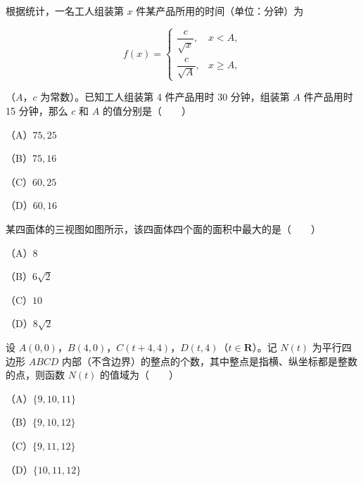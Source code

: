 \begin{question}
根据统计，一名工人组装第 $x$ 件某产品所用的时间（单位：分钟）为

\nopagebreak[4]
\[
f(x)=\begin{cases}\dfrac{c}{\sqrt{x}},&x<A,\\[3mm]\dfrac{c}{\sqrt{A}},&x\geqslant A,\end{cases}
\]

（$A$，$c$ 为常数）。已知工人组装第 4 件产品用时 30 分钟，组装第 $A$ 件产品用时 15 分钟，那么 $c$ 和 $A$ 的值分别是\mbox{（　　）}

（A）$75,25$

（B）$75,16$

（C）$60,25$

（D）$60,16$

\Needspace{0.4\textheight}
\end{question}
\begin{question}
某四面体的三视图如图所示，该四面体四个面的面积中最大的是\mbox{（　　）}

（A）$8$

（B）$6\sqrt2$

（C）$10$

（D）$8\sqrt2$
\nopagebreak[4]
\begin{center}\end{center}
\nopagebreak[4]
\end{question}
\begin{question}
设 $A(0,0)$，$B(4,0)$，$C(t+4,4)$，$D(t,4)$（$t\in\mathbf R$）。记 $N(t)$ 为平行四边形 $ABCD$ 内部（不含边界）的整点的个数，其中整点是指横、纵坐标都是整数的点，则函数 $N(t)$ 的值域为\mbox{（　　）}

（A）$\{9,10,11\}$

（B）$\{9,10,12\}$

（C）$\{9,11,12\}$

（D）$\{10,11,12\}$

\end{question}

